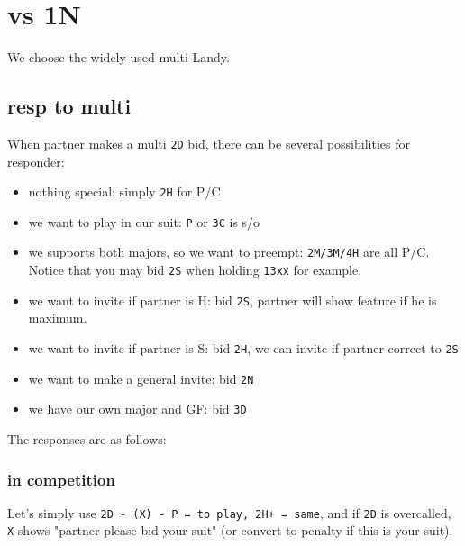 \section{vs 1N}

We choose the widely-used multi-Landy.



\subsection{resp to multi}

When partner makes a multi \texttt{2D} bid, there can be several possibilities for responder:
\begin{itemize}
    \setlength{\itemsep}{0pt}
    \item nothing special: simply \texttt{2H} for P/C
    \item we want to play in our suit: \texttt{P} or \texttt{3C} is s/o
    \item we supports both majors, so we want to preempt: \texttt{2M/3M/4H} are all P/C. Notice that you may bid \texttt{2S} when holding \texttt{13xx} for example.
    \item we want to invite if partner is H: bid \texttt{2S}, partner will show feature if he is maximum.
    \item we want to invite if partner is S: bid \texttt{2H}, we can invite if partner correct to \texttt{2S}
    \item we want to make a general invite: bid \texttt{2N}
    \item we have our own major and GF: bid \texttt{3D}
\end{itemize}

The responses are as follows:


\subsubsection{in competition}

Let's simply use \texttt{2D - (X) - P = to play, 2H+ = same}, and if \texttt{2D} is overcalled, \texttt{X} shows "partner please bid your suit" (or convert to penalty if this is your suit).

